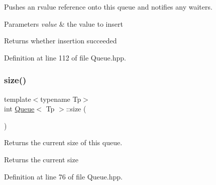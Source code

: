 Pushes an rvalue reference onto this queue and notifies any waiters.


\begin{DoxyParams}{Parameters}
{\em value} & the value to insert \\
\hline
\end{DoxyParams}
\begin{DoxyReturn}{Returns}
whether insertion succeeded 
\end{DoxyReturn}


Definition at line 112 of file Queue.\+hpp.


\begin{DoxyCode}{0}

\end{DoxyCode}
\mbox{\label{classQueue_a87514f47ccd19ce0ae845503d7627c5d}} 
\subsubsection{\texorpdfstring{size()}{size()}}
{\footnotesize\ttfamily template$<$typename Tp$>$ \\
int \mbox{\hyperlink{classQueue}{Queue}}$<$ Tp $>$\+::size (\begin{DoxyParamCaption}{ }\end{DoxyParamCaption})\hspace{0.3cm}{\ttfamily [inline]}}

Returns the current size of this queue.

\begin{DoxyReturn}{Returns}
the current size 
\end{DoxyReturn}


Definition at line 76 of file Queue.\+hpp.


\begin{DoxyCode}{0}

\end{DoxyCode}
\mbox{\label{classQueue_a0fdf9ec322669edbd88225b370587cf7}} 
